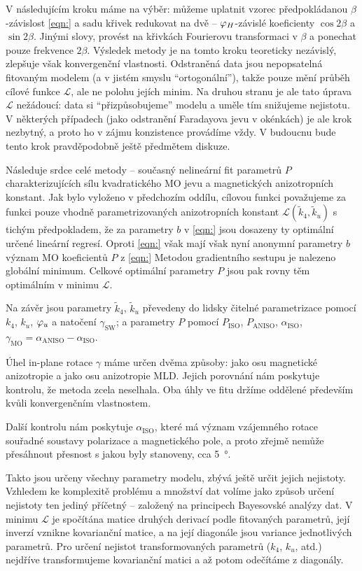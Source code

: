 V následujícím kroku máme na výběr: můžeme uplatnit vzorec předpokládanou $\beta$-závislost \eqref{eqn:} a sadu křivek redukovat na dvě -- $\varphi_H$-závislé koeficienty $\cos2\beta$ a $\sin2\beta$.
Jinými slovy, provést na křivkách Fourierovu transformaci v $\beta$ a ponechat pouze frekvence $2\beta$.
Výsledek metody je na tomto kroku teoreticky nezávislý, zlepšuje však konvergenční vlastnosti.
Odstraněná data jsou nepopsatelná fitovaným modelem (a v jistém smyslu ``ortogonální''), takže pouze mění průběh cílové funkce $\mathcal{L}$, ale ne polohu jejích minim.
Na druhou stranu je ale tato úprava $\mathcal{L}$ nežádoucí: data si ``přizpůsobujeme'' modelu a uměle tím snižujeme nejistotu.
V některých případech (jako odstranění Faradayova jevu v okénkách) je ale krok nezbytný, a proto ho v zájmu konzistence provádíme vždy.
V budoucnu bude tento krok pravděpodobně ještě předmětem diskuze.

Následuje srdce celé metody -- současný nelineární fit parametrů $P$ charakterizujících sílu kvadratického MO jevu a magnetických anizotropních konstant.
Jak bylo vyloženo v předchozím oddílu, cílovou funkci považujeme za funkci pouze vhodně parametrizovaných anizotropních konstant $\mathcal{L}(\tilde{k}_4, \tilde{k}_u)$ s tichým předpokladem, že za parametry $b$ v \eqref{eqn:} jsou dosazeny ty optimální určené lineární regresí.
Oproti \eqref{eqn:} však mají však nyní anonymní parametry $b$ význam MO koeficientů $P$ z \eqref{eqn:}
Metodou gradientního sestupu je nalezeno globální minimum.
Celkové optimální parametry $P$ jsou pak rovny těm optimálním v minimu $\mathcal{L}$.

Na závěr jsou parametry $\tilde{k}_4$, $\tilde{k}_u$ převedeny do lidsky čitelné parametrizace pomocí $k_4$, $k_u$, $\varphi_u$ a natočení $\gamma_\textrm{SW}$; a parametry $P$ pomocí $P_\textrm{ISO}$, $P_\textrm{ANISO}$, $\alpha_\textrm{ISO}$, $\gamma_\textrm{MO}=\alpha_\textrm{ANISO}-\alpha_\textrm{ISO}$.

Úhel in-plane rotace $\gamma$ máme určen dvěma způsoby: jako osu magnetické anizotropie a jako osu anizotropie MLD.
Jejich porovnání nám poskytuje kontrolu, že metoda zcela neselhala.
Oba úhly ve fitu držíme oddělené především kvůli konvergenčním vlastnostem.

Další kontrolu nám poskytuje $\alpha_\textrm{ISO}$, které má význam vzájemného rotace souřadné soustavy polarizace a magnetického pole, a proto zřejmě nemůže přesáhnout přesnost s jakou byly stanoveny, cca \SI{5}{\degree}.

Takto jsou určeny všechny parametry modelu, zbývá ještě určit jejich nejistoty.
Vzhledem ke komplexitě problému a množství dat volíme jako způsob určení nejistoty ten jediný příčetný -- založený na principech Bayesovské analýzy dat\cite{gelmanBayesianDataAnalysis2014}.
V minimu $\mathcal{L}$ je spočítána matice druhých derivací podle fitovaných parametrů, její inverzí vznikne kovarianční matice, a na její diagonále jsou variance jednotlivých parametrů.
Pro určení nejistot transformovaných parametrů ($k_4$, $k_u$, atd.) nejdříve transformujeme kovarianční matici a až potom odečítáme z diagonály.
